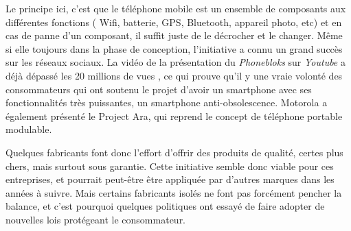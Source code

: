 \bigbreak
Le principe ici, c'est que le téléphone mobile est un ensemble de composants aux différentes fonctions ( Wifi, batterie, GPS, Bluetooth, appareil photo, etc) et en cas de panne d'un composant, il suffit juste de le décrocher et le changer. 
Même si elle toujours dans la phase de conception, l'initiative a connu un grand succès sur les réseaux sociaux. La vidéo de la présentation du \textit{Phonebloks} sur \textit{Youtube} a déjà dépassé les 20 millions de vues \cite{pb_yt}, ce qui prouve qu'il y une vraie volonté des consommateurs qui ont soutenu le projet d'avoir un smartphone avec ses fonctionnalités très puissantes, un smartphone anti-obsolescence. Motorola a également présenté le Project Ara, qui reprend le concept de téléphone portable modulable.

\bigbreak
Quelques fabricants font donc l'effort d'offrir des produits de qualité, certes plus chers, mais surtout sous garantie. Cette initiative semble donc viable pour ces entreprises, et pourrait peut-être être appliquée par d'autres marques dans les années à suivre. Mais certains fabricants isolés ne font pas forcément pencher la balance, et c'est pourquoi quelques politiques ont essayé de faire adopter de nouvelles lois protégeant le consommateur.










